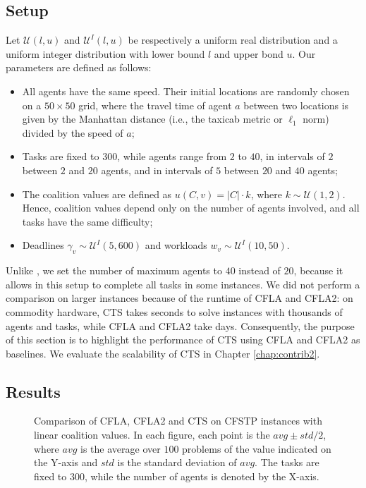\subsection{Setup}

Let $\mathcal{U}(l, u)$ and $\mathcal{U}^I(l, u)$ be respectively a uniform real
distribution and a uniform integer distribution with lower bound $l$ and upper bond $u$.
Our parameters are defined as follows:
\begin{itemize}
    \item All agents have the same speed. Their initial locations are randomly chosen on a
        $50 \times 50$ grid, where the travel time of agent $a$ between two locations is
        given by the Manhattan distance (i.e., the taxicab metric or $\ell_1$ norm)
        divided by the speed of $a$;
    \item Tasks are fixed to $300$, while agents range from $2$ to $40$, in intervals of
        $2$ between $2$ and $20$ agents, and in intervals of $5$ between $20$ and $40$
        agents;
    \item The coalition values are defined as $u(C, v) = |C| \cdot k$, where $k \sim
        \mathcal{U}(1, 2)$. Hence, coalition values depend only on the number of agents
        involved, and all tasks have the same difficulty;
    \item Deadlines $\gamma_v \sim \mathcal{U}^I(5,600)$ and workloads $w_v \sim
        \mathcal{U}^I(10, 50)$.
\end{itemize}

Unlike \cite{ramchurn2010cfstp}, we set the number of maximum agents to $40$ instead of
$20$, because it allows in this setup to complete all tasks in some instances. We did not
perform a comparison on larger instances because of the runtime of CFLA and CFLA2: on
commodity hardware, CTS takes seconds to solve instances with thousands of agents and
tasks, while CFLA and CFLA2 take days. Consequently, the purpose of this section is to
highlight the performance of CTS using CFLA and CFLA2 as baselines. We evaluate the
scalability of CTS in Chapter \ref{chap:contrib2}.

\subsection{Results}

\begin{figure}[t]
    \centering
    \begin{adjustbox}{width=\textwidth}
        
    \end{adjustbox}
    \caption[Comparison of CFLA, CFLA2 and CTS]{%
        Comparison of CFLA, CFLA2 and CTS on CFSTP instances with linear coalition values.
        In each figure, each point is the $avg \pm std/2$, where $avg$ is the average over
        $100$ problems of the value indicated on the Y-axis and $std$ is the standard
        deviation of $avg$. The tasks are fixed to $300$, while the number of agents is
        denoted by the X-axis.}
    \label{fig:c1test1}
\end{figure}

